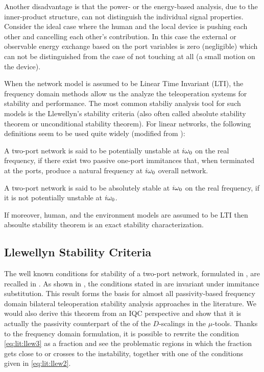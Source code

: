 Another disadvantage is that the power- or the energy-based analysis, due to the inner-product structure, can not distinguish the individual 
signal properties. Consider the ideal case where the human and the local device is pushing each other and cancelling each other's contribution. 
In this case the external or observable energy exchange based on the port variables is zero (negligible) which can not be distinguished from 
the case of not touching at all (a small motion on the device). 


When the network model is assumed to be Linear Time Invariant (LTI), the frequency domain methods
allow us the analyze the teleoperation systems for stability and performance. The most common stabiliy analysis tool for such 
models is the Llewellyn's stability criteria (also often called absolute stability theorem or unconditional stability theorem). 
For linear networks, the following definitions seem to be used quite widely (modified from \cite{chen91}): 

\begin{define} A two-port network is said to be potentially unstable at $i\omega_0$ on the real frequency, 
if there exist two passive one-port immitances that, when terminated at the ports, produce a natural frequency at $i\omega_0$ overall network.   
\end{define}

\begin{define} A two-port network is said to be absolutely stable at $i\omega_0$ on the real frequency, 
if it is not potentially unstable at $i\omega_0$.   
\end{define}

If moreover,  human, and the environment models are assumed to be LTI then absoulte stability theorem is an exact stability characterization. 

\subsection{Llewellyn Stability Criteria}\label{sec:llewellyn}
The well known conditions for stability of a two-port network, formulated in \cite{llewellyn,bolinder,rollett}, are recalled in .
As shown in \cite{rollett}, the conditions stated in  are invariant under immitance substitution. This result forms the 
basis for almost all passivity-based frequency domain bilateral teleoperation stability analysis approaches in the literature. 
We would also derive this theorem from an IQC perspective and show that it is actually the passivity counterpart of the 
of the $D$-scalings in the $\mu$-tools. Thanks to the frequency domain formulation, it is possible  to rewrite the condition 
\eqref{eq:lit:llew3} as a fraction and see the problematic regions in which the fraction gets close to or crosses to the instability, 
together with one of the conditions given in \eqref{eq:lit:llew2}. 


